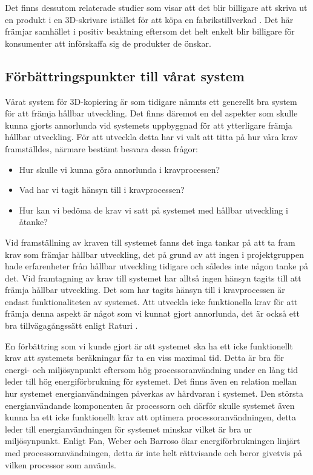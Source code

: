 Det finns dessutom relaterade studier som visar att det blir billigare att skriva ut en produkt i en 3D-skrivare istället för att köpa en fabrikstillverkad \cite{wittbrodt2013life}. Det här främjar samhället i positiv beaktning eftersom det helt enkelt blir billigare för konsumenter att införskaffa sig de produkter de önskar. 

\subsection{Förbättringspunkter till vårat system}
Vårat system för 3D-kopiering är som tidigare nämnts ett generellt bra system för att främja hållbar utveckling. Det finns däremot en del aspekter som skulle kunna gjorts annorlunda vid systemets uppbyggnad för att ytterligare främja hållbar utveckling. För att utveckla detta har vi valt att titta på hur våra krav framställdes, närmare bestämt besvara dessa frågor:

\begin{itemize}
	\item Hur skulle vi kunna göra annorlunda i kravprocessen?
	\item Vad har vi tagit hänsyn till i kravprocessen?
	\item Hur kan vi bedöma de krav vi satt på systemet med hållbar utveckling i åtanke?
\end{itemize}
Vid framställning av kraven till systemet fanns det inga tankar på att ta fram krav som främjar hållbar utveckling, det på grund av att ingen i projektgruppen hade erfarenheter från hållbar utveckling tidigare och således inte någon tanke på det. Vid framtagning av krav till systemet har alltså ingen hänsyn tagits till att främja hållbar utveckling. Det som har tagits hänsyn till i kravprocessen är endast funktionaliteten av systemet. Att utveckla icke funktionella krav för att främja denna aspekt är något som vi kunnat gjort annorlunda, det är också ett bra tillvägagångssätt enligt Raturi \cite{raturi2014developing}. 

En förbättring som vi kunde gjort är att systemet ska ha ett icke funktionellt krav att systemets beräkningar får ta en viss maximal tid. Detta är bra för energi- och miljösynpunkt eftersom hög processoranvändning under en lång tid leder till hög energiförbrukning för systemet. Det finns även en relation mellan hur systemet energianvändningen påverkas av hårdvaran i systemet. Den största energianvändande komponenten är processorn och därför skulle systemet även kunna ha ett icke funktionellt krav att optimera processoranvändningen, detta leder till energianvändningen för systemet minskar vilket är bra ur miljösynpunkt. Enligt Fan, Weber och Barroso \cite{fan2007power} ökar energiförbrukningen linjärt med processoranvändningen, detta är inte helt rättvisande och beror givetvis på vilken processor som används. 

